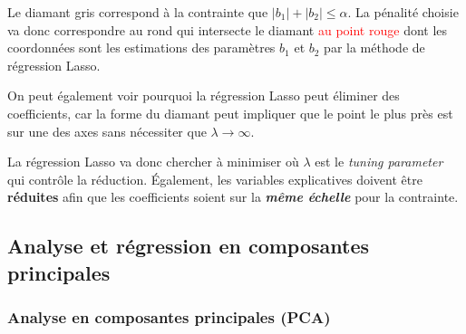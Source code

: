 \documentclass[french]{article}
\begin{document}
\begin{multicols*}{2}
\begin{definitionNOHFILL}
\begin{definitionNOHFILLsub}[Visualisation pour $p = 2$]
\begin{center}
\end{center}

\textcolor{ashgrey!80!black}{Le diamant gris} correspond à la contrainte que $|b_{1}| + |b_{2}| \leq \alpha$. La pénalité choisie va donc correspondre au rond qui intersecte le diamant \textcolor{red}{au point rouge} dont les coordonnées sont les estimations des paramètres $b_{1}$ et $b_{2}$ par la méthode de régression Lasso. 

\bigskip

On peut également voir pourquoi la régression Lasso peut éliminer des coefficients, car la forme du diamant peut impliquer que le point le plus près est sur une des axes sans nécessiter que $\lambda \rightarrow \infty$. 
\end{definitionNOHFILLsub}

La régression Lasso va donc chercher à minimiser  où $\lambda$ est le \og \textit{tuning parameter} \fg{} qui contrôle la réduction. Également, les variables explicatives doivent être \textbf{réduites} afin que les coefficients soient sur la \textbf{\textit{même échelle}} pour la contrainte.
\end{definitionNOHFILL}



\columnbreak
\subsection{Analyse et régression en composantes principales}
\subsubsection{Analyse en composantes principales (PCA)}\label{subsubsec:PCA}



\end{multicols*}
\end{document}

